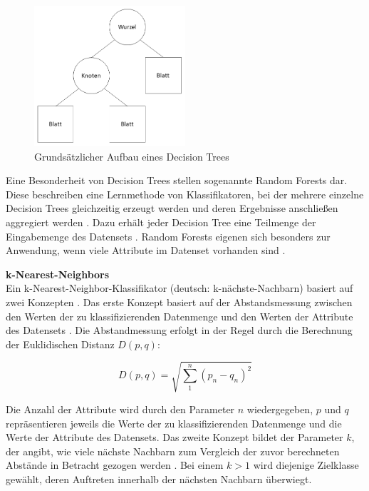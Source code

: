 \begin{figure}[H]
    \centering
    \includegraphics[width=0.5\textwidth]{images/DT}
    \caption{Grundsätzlicher Aufbau eines Decision Trees\label{fig:dt}}
\end{figure}

Eine Besonderheit von Decision Trees stellen sogenannte Random Forests dar. Diese beschreiben eine Lernmethode von Klassifikatoren, bei der mehrere einzelne Decision Trees gleichzeitig erzeugt werden und deren Ergebnisse anschließen aggregiert werden \cite{Alam2013}. Dazu erhält jeder Decision Tree eine Teilmenge der Eingabemenge des Datensets \cite{Alam2013}. Random Forests eigenen sich besonders zur Anwendung, wenn viele Attribute im Datenset vorhanden sind \cite{Alam2013}.

\textbf{k-Nearest-Neighbors\medskip}\\
Ein k-Nearest-Neighbor-Klassifikator (deutsch: k-nächste-Nachbarn) basiert auf zwei Konzepten \cite{Zhang2016}. Das erste Konzept basiert auf der Abstandsmessung zwischen den Werten der zu klassifizierenden Datenmenge und den Werten der Attribute des Datensets \cite{Zhang2016}. Die Abstandmessung erfolgt in der Regel durch die Berechnung der Euklidischen Distanz $D(p,q)$:

\[D(p,q)=\sqrt{\sum_1^n(p_{n}-q_{n})^{2}}\] 

Die Anzahl der Attribute wird durch den Parameter $n$ wiedergegeben, $p$ und $q$ repräsentieren jeweils die Werte der zu klassifizierenden Datenmenge und die Werte der Attribute des Datensets. Das zweite Konzept bildet der Parameter $k$, der angibt, wie viele nächste Nachbarn zum Vergleich der zuvor berechneten Abstände in Betracht gezogen werden \cite{Zhang2016}. Bei einem $k > 1$ wird diejenige Zielklasse gewählt, deren Auftreten innerhalb der nächsten Nachbarn überwiegt.

